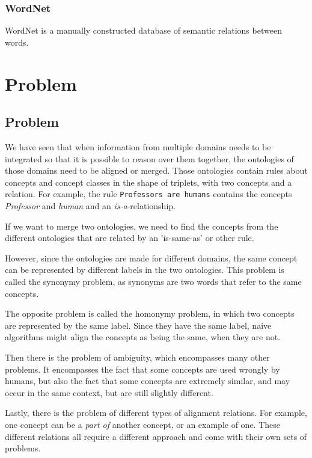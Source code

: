 \documentclass{article}
\begin{document}
 \subsubsection{WordNet}
 WordNet is a manually constructed database of semantic relations between words.
 
 \newpage
 \section{Problem}

 \subsection{Problem}
 We have seen that when information from multiple domains needs to be integrated so that it is possible to reason over them together, the ontologies of those domains need to be aligned or merged. %
  Those ontologies contain rules about concepts and concept classes in the shape of triplets, with two concepts and a relation. For example, the rule {\tt Professors are humans} contains the concepts \emph{Professor} and \emph{human} and an \emph{is-a}-relationship.
 
 If we want to merge two ontologies, we need to find the concepts from the different ontologies that are related by an 'is-same-as' or other rule.
 
 However, since the ontologies are made for different domains, the same concept can be represented by different labels in the two ontologies. This problem is called the synonymy problem, as synonyms are two words that refer to the same concepts.
 
 The opposite problem is called the homonymy problem, in which two concepts are represented by the same label. Since they have the same label, naive algorithms might align the concepts as being the same, when they are not.
 
 Then there is the problem of ambiguity, which encompasses many other problems. It encompasses the fact that some concepts are used wrongly by humans, but also the fact that some concepts are extremely similar, and may occur in the same context, but are still slightly different.
 
 Lastly, there is the problem of different types of alignment relations. For example, one concept can be a \emph{part of} another concept, or an example of one. These different relations all require a different approach and come with their own sets of problems. %
 
\end{document}
